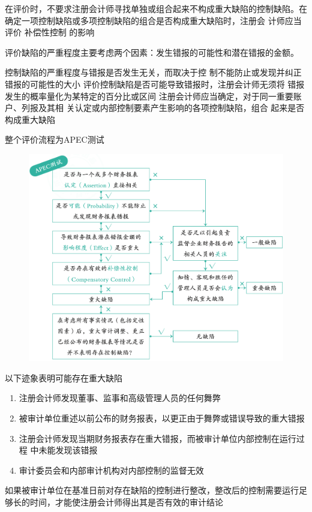 \documentclass[UTF8,12pt]{ctexart}
\numberwithin{equation}{section} %
\numberwithin{figure}{section}
\numberwithin{table}{section}
\begin{document}
	在评价时，不要求注册会计师寻找单独或组合起来不构成重大缺陷的控制缺陷。在确定一项控制缺陷或多项控制缺陷的组合是否构成重大缺陷时，注册会 计师应当评价  补偿性控制  的影响
	
	评价缺陷的严重程度主要考虑两个因素：发生错报的可能性和潜在错报的金额。
	
	控制缺陷的严重程度与错报是否发生无关，而取决于控 制不能防止或发现并纠正错报的可能性的大小 评价控制缺陷是否可能导致错报时，注册会计师无须将 错报发生的概率量化为某特定的百分比或区间 注册会计师应当确定，对于同一重要账户、列报及其相 关认定或内部控制要素产生影响的各项控制缺陷，组合 起来是否构成重大缺陷
	
	整个评价流程为APEC测试
	
	\begin{figure}
		\centering
		\includegraphics[width=0.7\linewidth]{pic/APECtest}
		\caption{}
		\label{fig:apectest}
	\end{figure}
	
	以下迹象表明可能存在重大缺陷
	\begin{enumerate}
		\item 注册会计师发现董事、监事和高级管理人员的任何舞弊 
		
		\item 被审计单位重述以前公布的财务报表，以更正由于舞弊或错误导致的重大错报 
		
		\item 注册会计师发现当期财务报表存在重大错报，而被审计单位内部控制在运行过程 中未能发现该错报
		
		\item 审计委员会和内部审计机构对内部控制的监督无效
	\end{enumerate}
	
	如果被审计单位在基准日前对存在缺陷的控制进行整改，整改后的控制需要运行足够长的时间，才能使注册会计师得出其是否有效的审计结论
\end{document}
